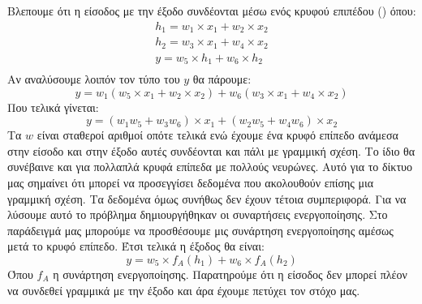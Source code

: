 
Βλεπουμε ότι η είσοδος με την έξοδο συνδέονται μέσω ενός κρυφού επιπέδου () όπου:
\begin{gather*}
    h_1=w_1\times x_1+w_2\times x_2 \\
    h_2=w_3\times x_1+w_4\times x_2 \\
    y=w_5\times h_1+w_6\times h_2 \\
\end{gather*}
Αν αναλύσουμε λοιπόν τον τύπο του $y$ θα πάρουμε:
$$y=w_1(w_5\times x_1+w_2\times x_2) + w_6(w_3\times x_1+w_4\times x_2)$$
Που τελικά γίνεται:
$$y=(w_1w_5+w_3w_6)\times x_1+(w_2w_5+w_4w_6)\times x_2$$
Τα $w$ είναι σταθεροί αριθμοί οπότε τελικά ενώ έχουμε ένα κρυφό επίπεδο ανάμεσα στην είσοδο και στην έξοδο αυτές συνδέονται και πάλι με γραμμική σχέση. Το ίδιο θα συνέβαινε και για πολλαπλά κρυφά επίπεδα με πολλούς νευρώνες. Αυτό για το
δίκτυο μας σημαίνει ότι μπορεί να προσεγγίσει δεδομένα που ακολουθούν επίσης μια γραμμική σχέση. Τα δεδομένα όμως συνήθως δεν έχουν τέτοια συμπεριφορά. Για να λύσουμε αυτό το πρόβλημα δημιουργήθηκαν οι συναρτήσεις ενεργοποίησης. Στο
παράδειγμά μας μπορούμε να προσθέσουμε μις συνάρτηση ενεργοποίησης αμέσως μετά το κρυφό επίπεδο. Έτσι τελικά η έξοδος θα είναι:
$$y=w_5\times f_A(h_1)+w_6\times f_A(h_2)$$
Όπου $f_A$ η συνάρτηση ενεργοποίησης. Παρατηρούμε ότι η είσοδος δεν μπορεί πλέον να συνδεθεί γραμμικά με την έξοδο και άρα έχουμε πετύχει τον στόχο μας.

